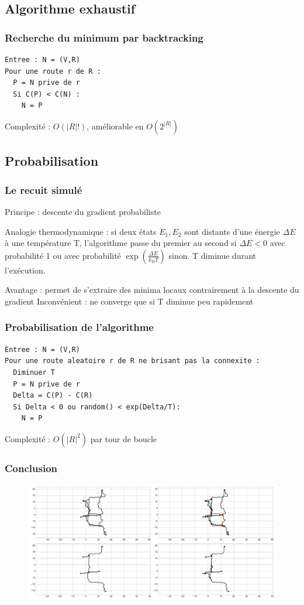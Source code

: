 \documentclass{beamer}[11pt]
\begin{document}
		\subsection{Algorithme exhaustif}

			\begin{frame}[fragile]
				\frametitle{Recherche du minimum par backtracking}
\begin{verbatim}
Entree : N = (V,R)
Pour une route r de R :
  P = N prive de r
  Si C(P) < C(N) :
    N = P
\end{verbatim}

			Complexité : $O(|R|!)$, améliorable en $O(2^{|R|})$

			\end{frame}

		\subsection{Probabilisation}

			\begin{frame}
				\frametitle{Le recuit simulé}

				Principe : descente du gradient probabiliste

				Analogie thermodynamique : si deux états $E_{1},E_{2}$ sont distants d'une énergie $\Delta E$ à une température T, l'algorithme passe du premier au second si $\Delta E < 0$ avec probabilité 1 ou avec probabilité $\exp(\frac{\Delta E}{k_{B}T})$ sinon. T diminue durant l'exécution.

				Avantage : permet de s'extraire des minima locaux contrairement à la descente du gradient
				Inconvénient : ne converge que si T diminue peu rapidement

			\end{frame}

			\begin{frame}
				\frametitle{Probabilisation de l'algorithme}
\begin{verbatim}
Entree : N = (V,R)
Pour une route aleatoire r de R ne brisant pas la connexite :
  Diminuer T
  P = N prive de r
  Delta = C(P) - C(R)
  Si Delta < 0 ou random() < exp(Delta/T):
    N = P
\end{verbatim}
			Complexité : $O(|R|^{2})$ par tour de boucle
			\end{frame}

	\begin{frame}
		\frametitle{Conclusion}
		\begin{figure}[t]
			\includegraphics[width=1\textwidth]{Pics/g21.png}
		\end{figure}
	\end{frame}
\end{document}
